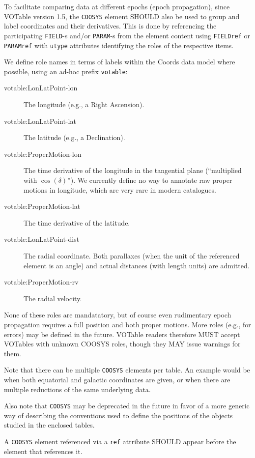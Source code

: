 \documentclass[11pt,a4paper]{ivoa}
\let\fg=\color
\def\attr#1{{\tt{\fg{DarkRed}#1}}}
\def\elem#1{{\tt{\fg{DarkRed}#1}}}
\begin{document}
To facilitate comparing data at different epochs (epoch propagation),
since VOTable version 1.5, the \elem{COOSYS} element SHOULD also be used
to group and label coordinates and their derivatives.  This is done by
referencing the participating \elem{FIELD}-s and/or \elem{PARAM}-s from
the element content using \elem{FIELDref} or \elem{PARAMref} with
\attr{utype} attributes identifying the roles of the respective items.

We define role names in terms of labels within the Coords data model
\citep{2022ivoa.specQ1004R} where possible, using an ad-hoc prefix
\verb|votable|:

\begin{description}
\item[votable:LonLatPoint-lon] The longitude (e.g., a Right Ascension).
\item[votable:LonLatPoint-lat] The latitude (e.g., a Declination).
\item[votable:ProperMotion-lon] The time derivative of the longitude in
the tangential plane (``multiplied with $\cos(\delta)$'').  We currently
define no way to annotate raw proper motions in longitude, which are
very rare in modern catalogues.
\item [votable:ProperMotion-lat] The time derivative of the latitude.
\item[votable:LonLatPoint-dist] The radial coordinate.  Both parallaxes
(when the unit of the referenced element is an angle) and actual
distances (with length units) are admitted.
\item[votable:ProperMotion-rv] The radial velocity.
\end{description}

None of these roles are mandatatory, but of course even rudimentary
epoch propagation requires a full position and both proper motions.
More roles (e.g., for errors) may be defined in the future.  VOTable
readers therefore MUST accept VOTables with unknown COOSYS roles, though
they MAY issue warnings for them.

Note that there can be multiple \elem{COOSYS} elements per table.  An
example would be when both equatorial and galactic coordinates are
given, or when there are multiple reductions of the same underlying
data.

Also note that \elem{COOSYS} may be deprecated in the
future in favor of a more generic way of describing the conventions used
to define the positions of the objects studied in the enclosed tables.

A \elem{COOSYS} element referenced via a \attr{ref} attribute
SHOULD appear before the element that references it.
\end{document}
